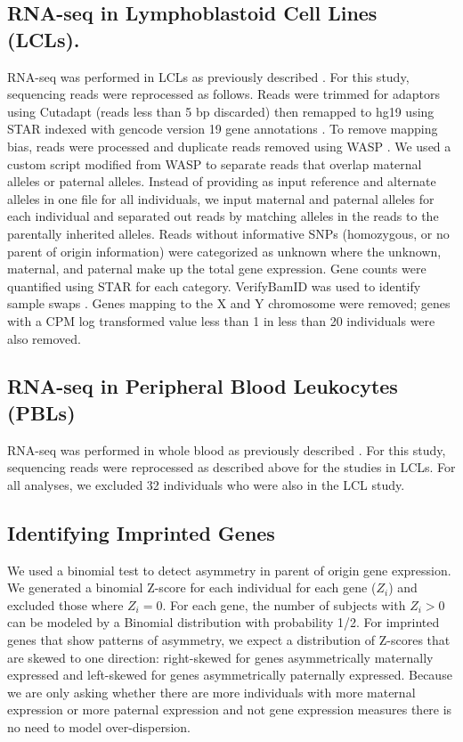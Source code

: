 \subsection{RNA-seq in Lymphoblastoid Cell Lines (LCLs).}\label{RNA-seq in Lymphoblastoid Cell Lines (LCLs).}
RNA-seq was performed in LCLs as previously described \citep{Cusanovich:2016id}. For this study, sequencing reads were reprocessed as follows. Reads were trimmed for adaptors using Cutadapt (reads less than 5 bp discarded) then remapped to hg19 using STAR indexed with gencode version 19 gene annotations \citep{Dobin:2002by, Martin:2011eu}. To remove mapping bias, reads were processed and duplicate reads removed using WASP \citep{vandeGeijn:2015hi}. We used a custom script modified from WASP to separate reads that overlap maternal alleles or paternal alleles. Instead of providing as input reference and alternate alleles in one file for all individuals, we input maternal and paternal alleles for each individual and separated out reads by matching alleles in the reads to the parentally inherited alleles. Reads without informative SNPs (homozygous, or no parent of origin information) were categorized as unknown where the unknown, maternal, and paternal make up the total gene expression. Gene counts were quantified using STAR for each category. VerifyBamID was used to identify sample swaps \citep{Jun:2012je}. Genes mapping to the X and Y chromosome were removed; genes with a CPM log transformed value less than 1 in less than 20 individuals were also removed.

\subsection{RNA-seq in Peripheral Blood Leukocytes (PBLs) }\label{RNA-seq in Peripheral Blood Leukocytes (PBLs) }
RNA-seq was performed in whole blood as previously described \citep{Stein:2016hn}. For this study, sequencing reads were reprocessed as described above for the studies in LCLs. For all analyses, we excluded 32 individuals who were also in the LCL study.

\subsection{Identifying Imprinted Genes}\label{Identifying Imprinted Genes}
We used a binomial test to detect asymmetry in parent of origin gene expression. We generated a binomial Z-score for each individual for each gene ($Z_i$) and excluded those where $Z_i =0$. For each gene, the number of subjects with $Z_i >0$ can be modeled by a Binomial distribution with probability 1/2. For imprinted genes that show patterns of asymmetry, we expect a distribution of Z-scores that are skewed to one direction: right-skewed for genes asymmetrically maternally expressed and left-skewed for genes asymmetrically paternally expressed. Because we are only asking whether there are more individuals with more maternal expression or more paternal expression and not gene expression measures there is no need to model over-dispersion.

